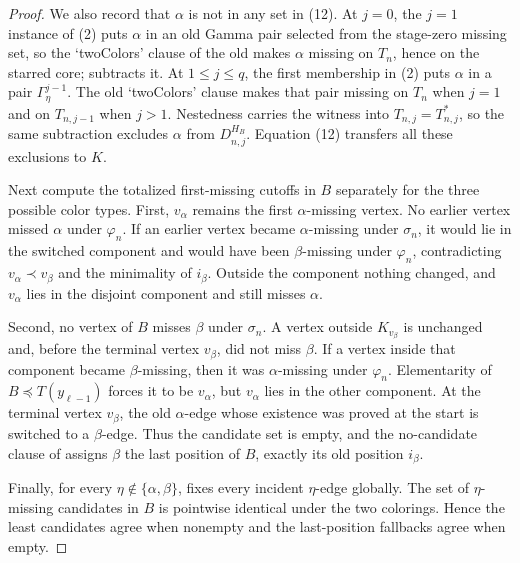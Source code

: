 \begin{proof}
We also record that $\alpha$ is not in any set in (12).  At $j=0$, the
$j=1$ instance of (2) puts $\alpha$ in an old Gamma pair selected from the
stage-zero missing set, so the `twoColors' clause of the old
 makes $\alpha$ missing on $T_n$, hence on the
starred core;  subtracts it.  At
$1\leq j\leq q$, the first membership in (2) puts $\alpha$ in a pair
$\Gamma^{j-1}_\eta$.  The old `twoColors' clause makes that pair missing
on $T_n$ when $j=1$ and on $T_{n,j-1}$ when $j>1$.  Nestedness carries the
witness into $T_{n,j}=T_{n,j}^{*}$, so the same subtraction excludes
$\alpha$ from $D^{H_B}_{n,j}$.  Equation (12) transfers all these exclusions
to $K$.

Next compute the totalized first-missing cutoffs in $B$ separately for the
three possible color types.  First, $v_\alpha$ remains the first
$\alpha$-missing vertex.  No earlier vertex missed $\alpha$ under
$\varphi_n$.  If an earlier vertex became $\alpha$-missing under
$\sigma_n$, it would lie in the switched component and would have been
$\beta$-missing under $\varphi_n$, contradicting
$v_\alpha\prec v_\beta$ and the minimality of $i_\beta$.  Outside the
component nothing changed, and $v_\alpha$ lies in the disjoint component
and still misses $\alpha$.

Second, no vertex of $B$ misses $\beta$ under $\sigma_n$.  A vertex
outside $K_{v_\beta}$ is unchanged and, before the terminal vertex
$v_\beta$, did not miss $\beta$.  If a vertex inside that component became
$\beta$-missing, then it was $\alpha$-missing under $\varphi_n$.
Elementarity of $B\preccurlyeq T(y_{\ell-1})$ forces it to be
$v_\alpha$, but $v_\alpha$ lies in the other component.  At the terminal
vertex $v_\beta$, the old $\alpha$-edge whose existence was proved at the
start is switched to a $\beta$-edge.  Thus the candidate set is empty, and
the no-candidate clause of  assigns
$\beta$ the last position of $B$, exactly its old position $i_\beta$.

Finally, for every $\eta\notin\{\alpha,\beta\}$,
 fixes every incident $\eta$-edge globally.
The set of $\eta$-missing candidates in $B$ is pointwise identical under
the two colorings.  Hence the least candidates agree when nonempty and the
last-position fallbacks agree when empty.


\end{proof}
